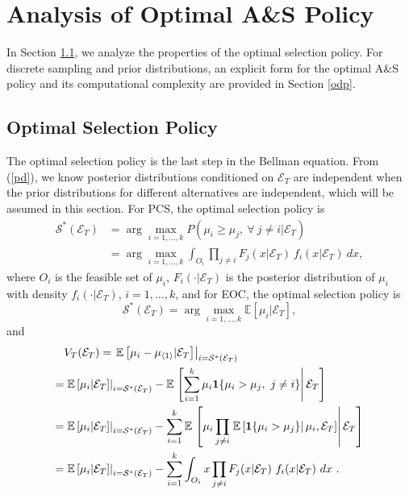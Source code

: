 \documentclass[journal]{IEEEtran}
\begin{document}
 \section{Analysis of Optimal A\&S Policy}\label{asp}
 In Section \ref{os}, we analyze the properties of the optimal selection policy. For discrete sampling and prior distributions, an explicit form for the optimal A\&S policy and its computational complexity are provided in Section \ref{odp}.
 \subsection{Optimal Selection Policy}\label{os}
The optimal selection policy is the last step in the Bellman equation. From (\ref{pd}), we know posterior distributions conditioned on $\mathcal{E}_T$ are independent when the prior distributions for different alternatives are independent, which will be assumed in this section. 
 For PCS, the optimal selection policy is
 \begin{equation*}\label{sp1}
  \begin{aligned}
  \mathcal{S}^{*}(\mathcal{E}_T)&=\arg\max_{i=1,\ldots,k} P(\mu_i\geq \mu_j,~\forall~j\neq i|\mathcal{E}_T)\\
  &=\arg\max_{i=1,\ldots,k}\int_{O_i} \prod_{j\neq i} F_j(x|\mathcal{E}_T) ~f_i(x|\mathcal{E}_T) ~dx,
  \end{aligned}
  \end{equation*}
  where $O_i$ is the feasible set of $\mu_i$, $F_i(\cdot|\mathcal{E}_T)$ is the posterior distribution of $\mu_i$ with density $f_i(\cdot|\mathcal{E}_T)$, $i=1,\ldots,k$, 
 and for EOC, 
 the optimal selection policy is 
  \begin{equation*}\label{sp2}\mathcal{S}^{*}(\mathcal{E}_T)=\arg\max_{i=1,\ldots,k} \mathbb{E}\left[ \mu_i|\mathcal{E}_T\right],\end{equation*}
  and \small
   \begin{align*}
  &V_T(\mathcal{E}_T)=\left.\mathbb{E}\left[ \mu_{i}-\mu_{\langle 1 \rangle}|\mathcal{E}_T\right]\right|_{i=\mathcal{S}^{*}(\mathcal{E}_T)}\\
   =&\left.\mathbb{E}\left[ \mu_i|\mathcal{E}_T\right]\right|_{i=\mathcal{S}^{*}(\mathcal{E}_T)}-\mathbb{E}\left.\left[\sum_{i=1}^{k}\mu_i{\bf1}\{ \mu_i>\mu_j, ~j\neq i \}\right|\mathcal{E}_T\right]\\
  =&\left.\mathbb{E}\left[ \mu_i|\mathcal{E}_T\right]\right|_{i=\mathcal{S}^{*}(\mathcal{E}_T)}-\sum_{i=1}^{k}\mathbb{E}\left.\left[ \mu_i\prod_{j\neq i}\left.\mathbb{E}\left[{\bf1}\{ \mu_i>\mu_j \}\right|\mu_i,\mathcal{E}_T\right]\right|\mathcal{E}_T\right]\\
  =&\left.\mathbb{E}\left[ \mu_i|\mathcal{E}_T\right]\right|_{i=\mathcal{S}^{*}(\mathcal{E}_T)}-\sum_{i=1}^{k}\int_{O_i} x  \prod_{j\neq i} F_j(x|\mathcal{E}_T) ~f_i(x|\mathcal{E}_T) ~dx~.  \end{align*}\normalsize
  
\end{document}
